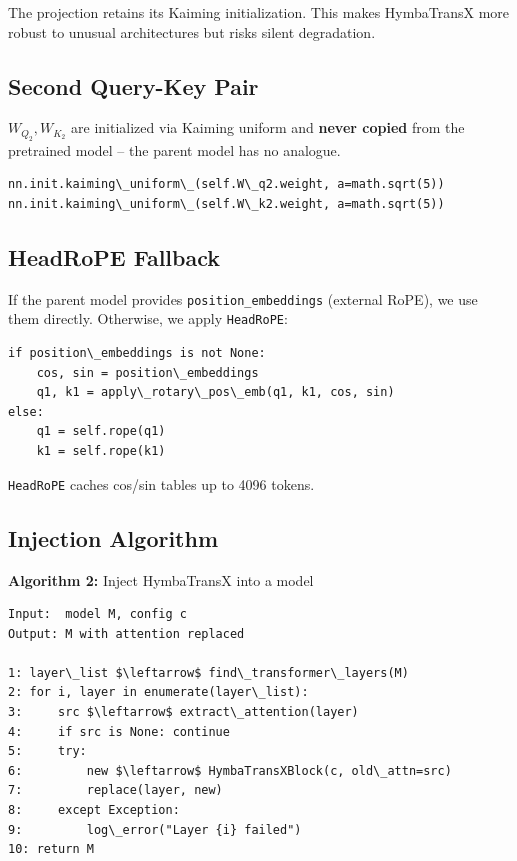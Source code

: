 The projection retains its Kaiming initialization. This makes HymbaTransX 
more robust to unusual architectures but risks silent degradation.

\subsection{Second Query-Key Pair}

$W_{Q_2}, W_{K_2}$ are initialized via Kaiming uniform and \textbf{never copied} 
from the pretrained model -- the parent model has no analogue.

\begin{lstlisting}
nn.init.kaiming\_uniform\_(self.W\_q2.weight, a=math.sqrt(5))
nn.init.kaiming\_uniform\_(self.W\_k2.weight, a=math.sqrt(5))
\end{lstlisting}

\subsection{HeadRoPE Fallback}

If the parent model provides \texttt{position\_embeddings} (external RoPE), we use 
them directly. Otherwise, we apply \texttt{HeadRoPE}:

\begin{lstlisting}
if position\_embeddings is not None:
    cos, sin = position\_embeddings
    q1, k1 = apply\_rotary\_pos\_emb(q1, k1, cos, sin)
else:
    q1 = self.rope(q1)
    k1 = self.rope(k1)
\end{lstlisting}

\texttt{HeadRoPE} caches cos/sin tables up to 4096 tokens.

\subsection{Injection Algorithm}

\textbf{Algorithm 2:} Inject HymbaTransX into a model
\begin{lstlisting}
Input:  model M, config c
Output: M with attention replaced

1: layer\_list $\leftarrow$ find\_transformer\_layers(M)
2: for i, layer in enumerate(layer\_list):
3:     src $\leftarrow$ extract\_attention(layer)
4:     if src is None: continue
5:     try:
6:         new $\leftarrow$ HymbaTransXBlock(c, old\_attn=src)
7:         replace(layer, new)
8:     except Exception:
9:         log\_error("Layer {i} failed")
10: return M
\end{lstlisting}


